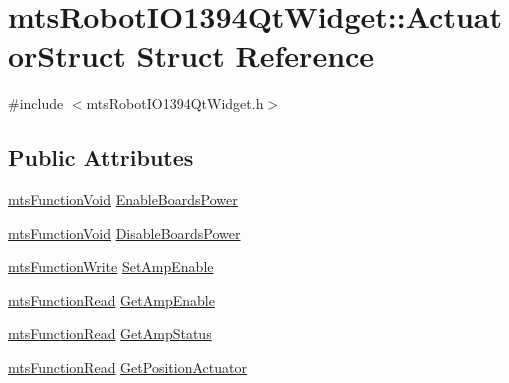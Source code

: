 \hypertarget{structmts_robot_i_o1394_qt_widget_1_1_actuator_struct}{\section{mts\-Robot\-I\-O1394\-Qt\-Widget\-:\-:Actuator\-Struct Struct Reference}
\label{structmts_robot_i_o1394_qt_widget_1_1_actuator_struct}
}


{\ttfamily \#include $<$mts\-Robot\-I\-O1394\-Qt\-Widget.\-h$>$}

\subsection*{Public Attributes}
\begin{DoxyCompactItemize}
\item 
\hyperlink{classmts_function_void}{mts\-Function\-Void} \hyperlink{structmts_robot_i_o1394_qt_widget_1_1_actuator_struct_a5ccb45f1cdb9f9993a006edfedd77118}{Enable\-Boards\-Power}
\item 
\hyperlink{classmts_function_void}{mts\-Function\-Void} \hyperlink{structmts_robot_i_o1394_qt_widget_1_1_actuator_struct_afa0e0a70ea5ab7d803a6adb3c19f99ae}{Disable\-Boards\-Power}
\item 
\hyperlink{classmts_function_write}{mts\-Function\-Write} \hyperlink{structmts_robot_i_o1394_qt_widget_1_1_actuator_struct_a85ac6a5f967dce213eab71e5f2c44dde}{Set\-Amp\-Enable}
\item 
\hyperlink{classmts_function_read}{mts\-Function\-Read} \hyperlink{structmts_robot_i_o1394_qt_widget_1_1_actuator_struct_a020abb34a901cd2968f34d5bc39507c7}{Get\-Amp\-Enable}
\item 
\hyperlink{classmts_function_read}{mts\-Function\-Read} \hyperlink{structmts_robot_i_o1394_qt_widget_1_1_actuator_struct_a7c98ed643a2f51e4aa2adaee0b4989fc}{Get\-Amp\-Status}
\item 
\hyperlink{classmts_function_read}{mts\-Function\-Read} \hyperlink{structmts_robot_i_o1394_qt_widget_1_1_actuator_struct_a0e498ee30ff12970c23db900839d4c48}{Get\-Position\-Actuator}
\end{DoxyCompactItemize}


